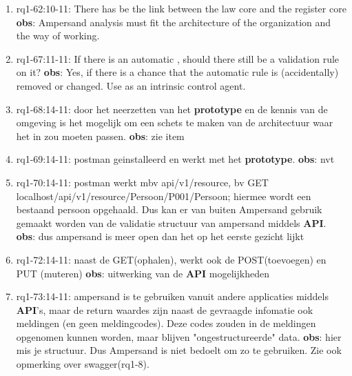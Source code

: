 \begin{enumerate}
    
    \item rq1-62:10-11: There has be the  link between the {law core} and the {register core}
    \newline\textbf{obs}: Ampersand analysis must fit the architecture of the organization and the way of working.
    
    \item rq1-67:11-11: If there is an automatic , should there still be a validation rule on it?
    \newline\textbf{obs}: Yes, if there is a chance that the automatic rule is (accidentally) removed or changed.
    Use as an intrinsic control agent.
    
    \item rq1-68:14-11: door het neerzetten van het \textbf{prototype} en de kennis van de omgeving is het mogelijk om een schets te maken van de architectuur waar het in zou moeten passen.
    \newline\textbf{obs}: zie item
    
    \item rq1-69:14-11: postman geinstalleerd en werkt met het \textbf{prototype}.
    \newline\textbf{obs}: nvt
    
    \item rq1-70:14-11: postman werkt mbv api/v1/resource, bv GET localhost/api/v1/resource/Persoon/P001/Persoon; 
    hiermee wordt een bestaand persoon opgehaald. 
    Dus kan er van buiten Ampersand gebruik gemaakt worden van de validatie structuur van ampersand middels \textbf{API}.
    \newline\textbf{obs}: dus ampersand is meer open dan het op het eerste gezicht lijkt
    
    \item rq1-72:14-11: naast de GET(ophalen), werkt ook de POST(toevoegen) en PUT (muteren)
    \newline\textbf{obs}: uitwerking van de \textbf{API} mogelijkheden
    
    \item rq1-73:14-11: ampersand is te gebruiken vanuit andere applicaties middels \textbf{API}'s, maar de return waardes zijn naast de gevraagde infomatie ook meldingen (en geen meldingcodes). Deze codes zouden in de meldingen opgenomen kunnen worden, maar blijven "ongestructureerde" data.
    \newline\textbf{obs}: hier mis je structuur. 
    Dus Ampersand is niet bedoelt om zo te gebruiken. 
    Zie ook opmerking over swagger(rq1-8).
    

\end{enumerate}
